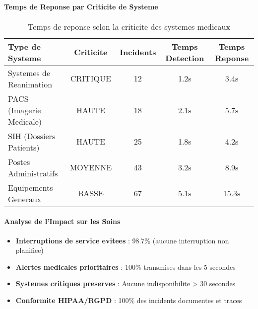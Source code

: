 \paragraph{Temps de Reponse par Criticite de Systeme}

\begin{table}[H]
    \centering
    \caption{Temps de reponse selon la criticite des systemes medicaux}
    \begin{tabular}{|l|c|c|c|c|}
        \hline
        \textbf{Type de Systeme} & \textbf{Criticite} & \textbf{Incidents} & \textbf{Temps Detection} & \textbf{Temps Reponse} \\
        \hline
        Systemes de Reanimation  & CRITIQUE           & 12                 & 1.2s                     & 3.4s                   \\
        \hline
        PACS (Imagerie Medicale) & HAUTE              & 18                 & 2.1s                     & 5.7s                   \\
        \hline
        SIH (Dossiers Patients)  & HAUTE              & 25                 & 1.8s                     & 4.2s                   \\
        \hline
        Postes Administratifs    & MOYENNE            & 43                 & 3.2s                     & 8.9s                   \\
        \hline
        Equipements Generaux     & BASSE              & 67                 & 5.1s                     & 15.3s                  \\
        \hline
    \end{tabular}
\end{table}

\paragraph{Analyse de l'Impact sur les Soins}

\begin{itemize}
    \item \textbf{Interruptions de service evitees} : 98.7\% (aucune interruption non planifiee)
    \item \textbf{Alertes medicales prioritaires} : 100\% transmises dans les 5 secondes
    \item \textbf{Systemes critiques preserves} : Aucune indisponibilite > 30 secondes
    \item \textbf{Conformite HIPAA/RGPD} : 100\% des incidents documentes et traces
\end{itemize}

